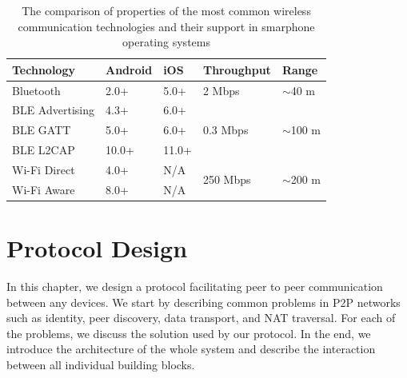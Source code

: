 \begin{table}
    \centering
    \begin{tabular}{ | l | l | l | l | l | }
      \hline
      \textbf{Technology} & \textbf{Android} & \textbf{iOS} & \textbf{Throughput} & \textbf{Range} \\
      \hline
      Bluetooth & 2.0+ & 5.0+ & 2 Mbps & $\sim$40 m \\
      \hline
      BLE Advertising & 4.3+ & 6.0+ & \multirow{3}{*}{0.3 Mbps} & \multirow{3}{*}{$\sim$100 m} \\
      BLE GATT & 5.0+ & 6.0+ & &  \\
      BLE L2CAP & 10.0+ & 11.0+ & &  \\
      \hline
      Wi-Fi Direct & 4.0+ & N/A & \multirow{2}{*}{250 Mbps} & \multirow{2}{*}{$\sim$200 m} \\
      Wi-Fi Aware & 8.0+ & N/A & & \\
      \hline
    \end{tabular}
    \caption{The comparison of properties of the most common wireless communication technologies and their support in smarphone operating systems
    }
    \label{wirelesstech_table}
  \end{table}







\chapter{Protocol Design}

In this chapter, we design a protocol facilitating peer to peer communication between any devices. We start by describing common problems in P2P networks such as identity, peer discovery, data transport, and NAT traversal. For each of the problems, we discuss the solution used by our protocol. In the end, we introduce the architecture of the whole system and describe the interaction between all individual building blocks.

